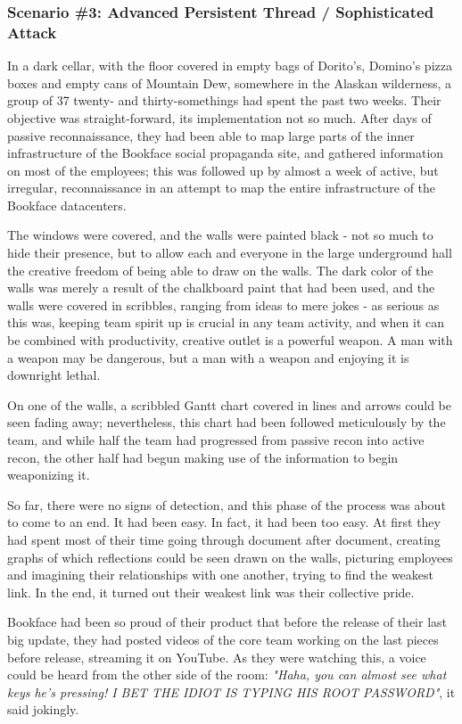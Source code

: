 \subsubsection{Scenario \#3: Advanced Persistent Thread / Sophisticated Attack}
In a dark cellar, with the floor covered in empty bags of Dorito's, Domino's pizza boxes and empty cans of Mountain Dew, somewhere in the Alaskan wilderness, a group of 37 twenty- and thirty-somethings had spent the past two weeks. Their objective was straight-forward, its implementation not so much. After days of passive reconnaissance, they had been able to map large parts of the inner infrastructure of the Bookface social propaganda site, and gathered information on most of the employees; this was followed up by almost a week of active, but irregular, reconnaissance in an attempt to map the entire infrastructure of the Bookface datacenters. 

The windows were covered, and the walls were painted black - not so much to hide their presence, but to allow each and everyone in the large underground hall the creative freedom of being able to draw on the walls. The dark color of the walls was merely a result of the chalkboard paint that had been used, and the walls were covered in scribbles, ranging from ideas to mere jokes - as serious as this was, keeping team spirit up is crucial in any team activity, and when it can be combined with productivity, creative outlet is a powerful weapon. A man with a weapon may be dangerous, but a man with a weapon and enjoying it is downright lethal. 

On one of the walls, a scribbled Gantt chart covered in lines and arrows could be seen fading away; nevertheless, this chart had been followed meticulously by the team, and while half the team had progressed from passive recon into active recon, the other half had begun making use of the information to begin weaponizing it. 

So far, there were no signs of detection, and this phase of the process was about to come to an end. It had been easy. In fact, it had been too easy. At first they had spent most of their time going through document after document, creating graphs of which reflections could be seen drawn on the walls, picturing employees and imagining their relationships with one another, trying to find the weakest link. In the end, it turned out their weakest link was their collective pride. 

Bookface had been so proud of their product that before the release of their last big update, they had posted videos of the core team working on the last pieces before release, streaming it on YouTube. As they were watching this, a voice could be heard from the other side of the room: \textit{"Haha, you can almost see what keys he's pressing! I BET THE IDIOT IS TYPING HIS ROOT PASSWORD"}, it said jokingly. 

